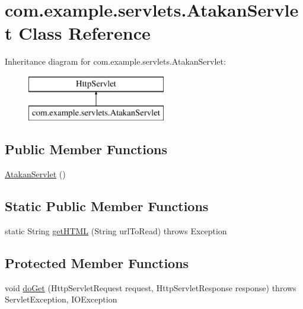 \hypertarget{classcom_1_1example_1_1servlets_1_1_atakan_servlet}{}\section{com.\+example.\+servlets.\+Atakan\+Servlet Class Reference}
\label{classcom_1_1example_1_1servlets_1_1_atakan_servlet}
Inheritance diagram for com.\+example.\+servlets.\+Atakan\+Servlet\+:\begin{figure}[H]
\begin{center}
\leavevmode
\includegraphics[height=2.000000cm]{classcom_1_1example_1_1servlets_1_1_atakan_servlet}
\end{center}
\end{figure}
\subsection*{Public Member Functions}
\begin{DoxyCompactItemize}
\item 
\hyperlink{classcom_1_1example_1_1servlets_1_1_atakan_servlet_a87e2532962ccd888df5a6e642ab6c047}{Atakan\+Servlet} ()
\end{DoxyCompactItemize}
\subsection*{Static Public Member Functions}
\begin{DoxyCompactItemize}
\item 
static String \hyperlink{classcom_1_1example_1_1servlets_1_1_atakan_servlet_a71394804fa75e2d1038b4ee08c7e7f71}{get\+H\+T\+M\+L} (String url\+To\+Read)  throws Exception 
\end{DoxyCompactItemize}
\subsection*{Protected Member Functions}
\begin{DoxyCompactItemize}
\item 
void \hyperlink{classcom_1_1example_1_1servlets_1_1_atakan_servlet_a958df833cc34bf6033b56121d82459d1}{do\+Get} (Http\+Servlet\+Request request, Http\+Servlet\+Response response)  throws Servlet\+Exception, I\+O\+Exception 
\end{DoxyCompactItemize}

